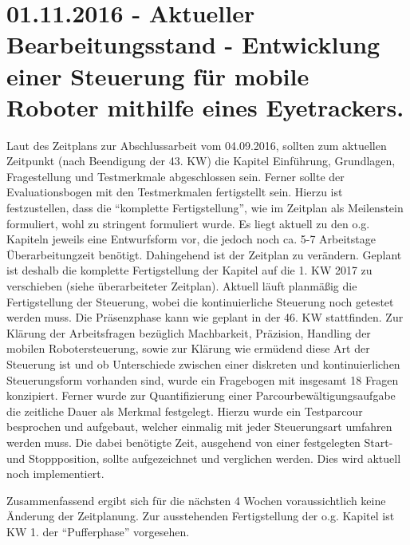 \documentclass[11pt,a4paper,onecolumn,twoside,ngerman]{book}
\begin{document}
\section*{01.11.2016 - Aktueller Bearbeitungsstand - Entwicklung einer Steuerung für mobile Roboter mithilfe eines Eyetrackers.}

Laut des Zeitplans zur Abschlussarbeit vom 04.09.2016, sollten zum aktuellen Zeitpunkt (nach Beendigung der 43. KW) die Kapitel Einführung, Grundlagen, Fragestellung und Testmerkmale abgeschlossen sein. Ferner sollte der Evaluationsbogen mit den Testmerkmalen fertigstellt sein. 
Hierzu ist festzustellen, dass die \enquote{komplette Fertigstellung}, wie im Zeitplan als Meilenstein formuliert, wohl zu stringent formuliert wurde. Es liegt aktuell zu den o.g. Kapiteln jeweils eine Entwurfsform vor, die jedoch noch ca. 5-7 Arbeitstage Überarbeitungzeit benötigt. Dahingehend ist der Zeitplan zu verändern. Geplant ist deshalb die komplette Fertigstellung der Kapitel auf die 1. KW 2017 zu verschieben (siehe überarbeiteter Zeitplan).
Aktuell läuft planmäßig die Fertigstellung der Steuerung, wobei die kontinuierliche Steuerung noch getestet werden muss. Die Präsenzphase kann wie geplant in der 46. KW stattfinden. 
Zur Klärung der Arbeitsfragen bezüglich Machbarkeit, Präzision, Handling der mobilen Robotersteuerung, sowie zur Klärung wie ermüdend diese Art der Steuerung ist und ob Unterschiede zwischen einer diskreten und kontinuierlichen Steuerungsform vorhanden sind, wurde ein Fragebogen mit insgesamt 18 Fragen konzipiert. 
Ferner wurde zur Quantifizierung einer Parcourbewältigungsaufgabe die zeitliche Dauer als Merkmal festgelegt. Hierzu wurde ein Testparcour besprochen und aufgebaut, welcher einmalig mit jeder Steuerungsart umfahren werden muss. Die dabei benötigte Zeit, ausgehend von einer festgelegten Start- und Stoppposition, sollte aufgezeichnet und verglichen werden. Dies wird aktuell noch implementiert.

Zusammenfassend ergibt sich für die nächsten 4 Wochen voraussichtlich keine Änderung der Zeitplanung. Zur ausstehenden Fertigstellung der o.g. Kapitel ist KW 1. der \enquote{Pufferphase} vorgesehen.
\end{document}

